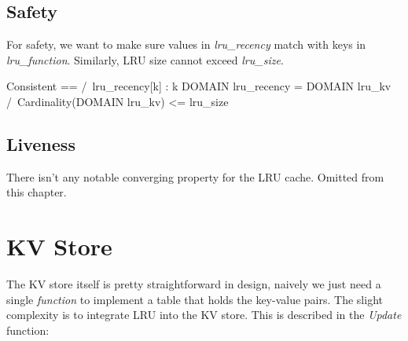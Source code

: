 \subsection{Safety}

For safety, we want to make sure values in \textit{lru\_recency} match with keys
in \textit{lru\_function}. Similarly, LRU size cannot exceed \textit{lru\_size}.\\

\begin{tla}
    Consistent ==
    /\ {lru_recency[k] : k \in DOMAIN lru_recency} = DOMAIN lru_kv
    /\ Cardinality(DOMAIN lru_kv) <= lru_size
\end{tla}
\begin{tlatex}
%
%
\end{tlatex}

\subsection{Liveness}

There isn't any notable converging property for the LRU cache. Omitted from this chapter. 

\section{KV Store}

The KV store itself is pretty straightforward in design, naively we just need a single 
\textit{function} to implement a table that holds the key-value pairs. The slight complexity 
is to integrate LRU into the KV store. This is described in the \textit{Update} function:

